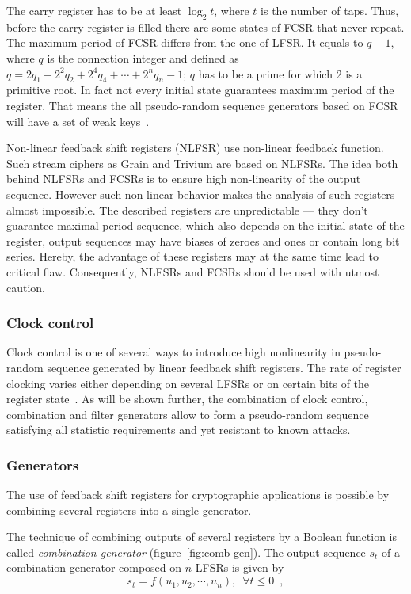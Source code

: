 The carry register has to be at least $\log_2 t$, where $t$ is the number of
taps. Thus, before the carry register is
filled there are some states of FCSR that never repeat. The maximum period of
FCSR differs from the one of LFSR. It equals to $q - 1$, where $q$ is the
connection integer and defined as
\mbox{$q = 2 q_1 + 2^2 q_2 + 2^4 q_4 + \cdots + 2^n q_n - 1$}; $q$ has to be a prime
for which 2 is a primitive root. In fact not every initial state guarantees
maximum period of the register. That means the all pseudo-random sequence
generators based on FCSR will have a set of weak
keys~\cite{schneier:applied_cryptography:2}.

Non-linear feedback shift registers (NLFSR) use non-linear feedback function.
Such stream ciphers as Grain and Trivium are based on NLFSRs. The idea both
behind NLFSRs and FCSRs is to ensure high non-linearity of the output sequence.
However such non-linear behavior makes the analysis of such registers almost
impossible. The described registers are unpredictable --- they don't guarantee
maximal-period sequence, which also depends on the initial state of the register,
output sequences may have biases of zeroes and ones or contain long bit series.
Hereby, the advantage of these registers may at the same time lead to critical
flaw. Consequently, NLFSRs and FCSRs should be used with utmost caution.


\subsubsection{Clock control}

Clock control is one of several ways to introduce high nonlinearity in
pseudo-random sequence generated by linear feedback shift registers. The rate of
register clocking varies either depending on several LFSRs or on certain bits
of the register state~\cite{usm:streamciphers}. As will be shown further, the combination of clock
control, combination and filter generators allow to form a pseudo-random
sequence satisfying all statistic requirements and yet resistant to known
attacks.

\subsubsection{Generators}

The use of feedback shift registers for cryptographic applications is possible by
combining several registers into a single generator.

The technique of combining outputs of several
registers by a Boolean function is called \textit{combination generator}
(figure~\ref{fig:comb-gen}). The output sequence $s_t$ of a combination generator
composed on $n$ LFSRs is given by
\begin{equation}
    \label{eqn:comb-gen-seq}
    s_t = f(u_1, u_2, \cdots, u_n), \enspace \forall t \leq 0 \enspace,
\end{equation}

